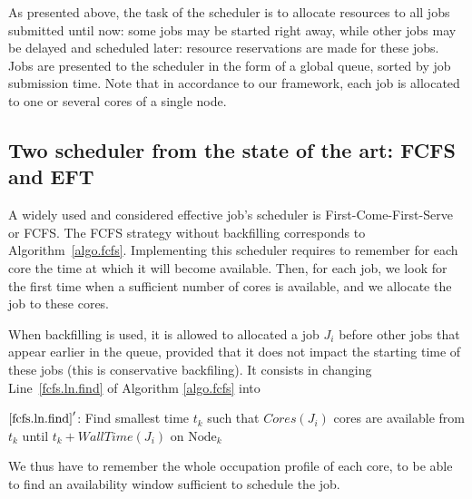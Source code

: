 \documentclass[conference,10pt]{IEEEtran}
\newcommand{\Node}[1]{\ensuremath{\mathrm{Node}_{#1}}\xspace}
\newcommand{\core}{\mathit{Cores}\xspace}
\newcommand{\walltime}{\mathit{WallTime}\xspace}
\begin{document}
As presented above, the task of the scheduler is to allocate resources
to all jobs submitted until now: some jobs may be started right away,
while other jobs may be delayed and scheduled later: resource
reservations are made for these jobs. Jobs are presented to the
scheduler in the form of a global queue, sorted by job submission
time.  Note that in accordance to our framework, each job is allocated
to one or several cores of a single node.





\subsection{Two scheduler from the state of the art: FCFS and EFT}\label{subsec.fcfs_eft}

A widely used and considered effective job's scheduler is
First-Come-First-Serve or FCFS. The FCFS strategy without backfilling
corresponds to Algorithm~\ref{algo.fcfs}. Implementing this scheduler
requires to remember for each core the time at which it will become
available. Then, for each job, we look for the first time when a
sufficient number of cores is available, and we allocate the job to
these cores.

When backfilling is used, it is allowed to allocated a job $J_i$
before other jobs that appear earlier in the queue, provided that it
does not impact the starting time of these jobs (this is conservative
backfiling). It consists in changing Line~\ref{fcfs.ln.find} of
Algorithm \ref{algo.fcfs} into
\begin{algorithmic}[0]
  \State $\ref{fcfs.ln.find}'$: Find smallest time $t_k$ such that $\core(J_i)$ cores are
  available from $t_k$ until $t_k + \walltime(J_i)$ on $\Node{k}$
\end{algorithmic}
We thus have to remember the whole occupation profile of each core, to
be able to find an availability window sufficient to schedule the job.
\end{document}
